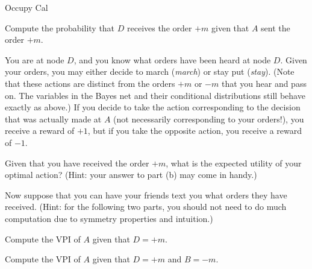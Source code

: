 \begin{problem}[]{Occupy Cal}
\begin{question}[4] Compute the probability that $D$ receives the order $+m$ given that $A$ sent the order $+m$. \\
\fbox{\begin{minipage}[t][4cm][t]{17cm}
\OneB
\end{minipage}}
\end{question}

You are at node $D$, and you know what orders have been heard at node $D$. Given your orders, you may either decide to march (\emph{march}) or stay put (\emph{stay}). (Note that these actions are distinct from the orders $+m$ or $-m$ that you hear and pass on. The variables in the Bayes net and their conditional distributions still behave exactly as above.) If you decide to take the action corresponding to the decision that was actually made at $A$ (not necessarily corresponding to your orders!), you receive a reward of $+1$, but if you take the opposite action, you receive a reward of $-1$. \\

\begin{question}[4] Given that you have received the order $+m$, what is the expected utility of your optimal action? (Hint: your answer to part (b) may come in handy.) \\
\fbox{\begin{minipage}[t][5cm][t]{17cm}
\OneC
\end{minipage}}
\end{question}

Now suppose that you can have your friends text you what orders they have received. (Hint: for the following two parts, you should not need to do much computation due to symmetry properties and intuition.)

\begin{question}[4] Compute the VPI of $A$ given that $D = +m$. \\
\fbox{\begin{minipage}[t][5cm][t]{17cm}
\OneD
\end{minipage}}
\end{question}

\begin{question}[4] Compute the VPI of $A$ given that $D = +m$ and $B = -m$. \\
\fbox{\begin{minipage}[t][5cm][t]{17cm}
\OneE
\end{minipage}}
\end{question}

\end{problem}